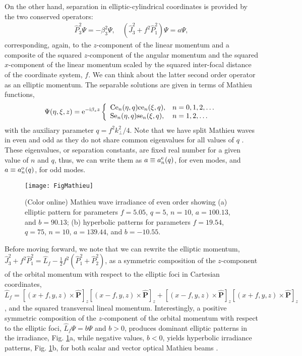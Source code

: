 \documentclass[12pt]{iopart}
\begin{document}
On the other hand, separation in elliptic-cylindrical coordinates is provided by the two conserved operators:
\begin{eqnarray}
\hat{P}_{3}^2 \Psi = - \beta_{3}^2  \Psi, \quad \left( \hat{J}_{3}^2 + f^{2} \hat{P}^{2}_{1} \right) \Psi = a \Psi,
\end{eqnarray}
corresponding, again, to the {$z$}-component of the linear momentum and a composite of the squared $z$-component of the angular momentum and the squared $x$-component of the linear momentum scaled by the squared inter-focal distance of the coordinate system, $f$.
We can think about the latter second order operator as an elliptic momentum.
The separable solutions are given in terms of Mathieu functions,
\begin{eqnarray}
\Psi(\eta, \xi, z) = {\rm e}^{-{\rm i} \beta_{z} z} \left\{ \begin{array}{ll}
\mathrm{Ce}_{n}(\eta, q) \mathrm{ce}_{n}(\xi, q), & n=0,1,2, \ldots \\
\mathrm{Se}_{n}(\eta, q) \mathrm{se}_{n}(\xi, q), & n=1,2, \ldots \\
\end{array} \right.
\end{eqnarray}
with the auxiliary parameter $q = f^2 k_{\perp}^2 / 4$.
Note that we have split Mathieu waves in even and odd as they do not share common eigenvalues for all values of $q$ \cite{Whittaker1927}.
These eigenvalues, or separation constants, are fixed real number for a given value of $n$ and $q$, thus, we can write them as $a \equiv a_{n}^{\rm e}(q)$, for even modes, and  $a \equiv a_{n}^{\rm o}(q)$, for odd modes.

\begin{figure} [t!]
	\center \texttt{[image: FigMathieu]}
	\caption{(Color online) Mathieu wave irradiance of even order showing (a) elliptic pattern for parameters $f=5.05$, $q=5$, $n=10$, $a=100.13$, and $b=90.13$; (b) hyperbolic patterns for parameters $f=19.54$, $q=75$, $n=10$, $a=139.44$, and $b=-10.55$.}
	\label{fig:FigMathieu}
\end{figure}
Before moving forward, we note that we can rewrite the elliptic momentum,
$\hat{J}_{3}^2 + f^{2} \hat{P}^{2}_{1} = \hat{L}_{f} - \frac{1}{2} f^2 \left( \hat{P}_{1}^2 + \hat{P}_{2}^{2} \right)$, as a symmetric composition of the $z$-component of the orbital momentum with respect to the elliptic foci in Cartesian coordinates, $\hat{L}_{f} = \left[ (x + f,y,z)  \times \hat{\bm{P}}  \right]_{z} \left[ (x - f,y,z)  \times \hat{\bm{P}}  \right]_{z} + \left[ (x - f,y,z)  \times \hat{\bm{P}}  \right]_{z} \left[ (x + f,y,z)  \times \hat{\bm{P}}  \right]_{z}$,
and the squared transversal lineal momentum.
Interestingly, a positive symmetric composition of the $z$-component of the orbital momentum with respect to the elliptic foci, $\hat{L}_{f} \Psi = b \Psi$ and $b >0$, produces dominant elliptic patterns in the irradiance, Fig. \ref{fig:FigMathieu}a, while negative values, $b < 0$, yields hyperbolic irradiance patterns, Fig. \ref{fig:FigMathieu}b, for both scalar and vector optical Mathieu beams \cite{GutierrezVega2000p1493, RodriguezLara2008p033813}.
\end{document}
